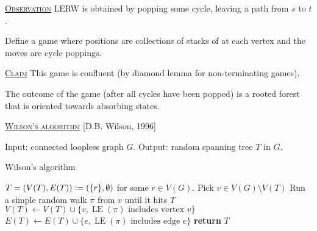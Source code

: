 \documentclass{report}
\def \LE {\operatorname{LE}}
\newcommand{\defeq}{\vcentcolon=}
\newcommand{\fancyem}[1]{\underline{\textsc{#1}}}
\theoremstyle{definition}
\theoremstyle{remark}
\numberwithin{equation}{section}
\begin{document}
\fancyem{Observation} LERW is obtained by popping some cycle, leaving a path from $s$ to $t$.

Define a game where positions are collections of stacks of at each vertex and the moves are cycle poppings.

\fancyem{Claim} This game is confluent (by diamond lemma for non-terminating games).

The outcome of the game (after all cycles have been popped) is a rooted forest that is oriented towards absorbing states.

\fancyem{Wilson's algorithm} [D.B. Wilson, 1996]

Input: connected loopless graph $G$.
Output: random spanning tree $T$ in $G$.

\begin{algorithm}[h]
    \caption{Wilson's algorithm}
    \label{algo:wilson}
    \begin{algorithmic}[1]
            \State $T = (V(T), E(T)) \defeq (\{r\}, \emptyset)$ for some $r \in V(G)$.
             
                \State Pick $v \in V(G) \setminus V(T)$
                \State Run a simple random walk $\pi$ from $v$ until it hits $T$
                \State $V(T) \gets V(T) \cup \{v, \LE(\pi) \text{ includes vertex } v\}$
                \State $E(T) \gets E(T) \cup \{e, \LE(\pi) \text{ includes edge } e\}$
            \EndWhile
            \State \textbf{return} $T$
        \EndProcedure
    \end{algorithmic}
\end{algorithm}
\end{document}
